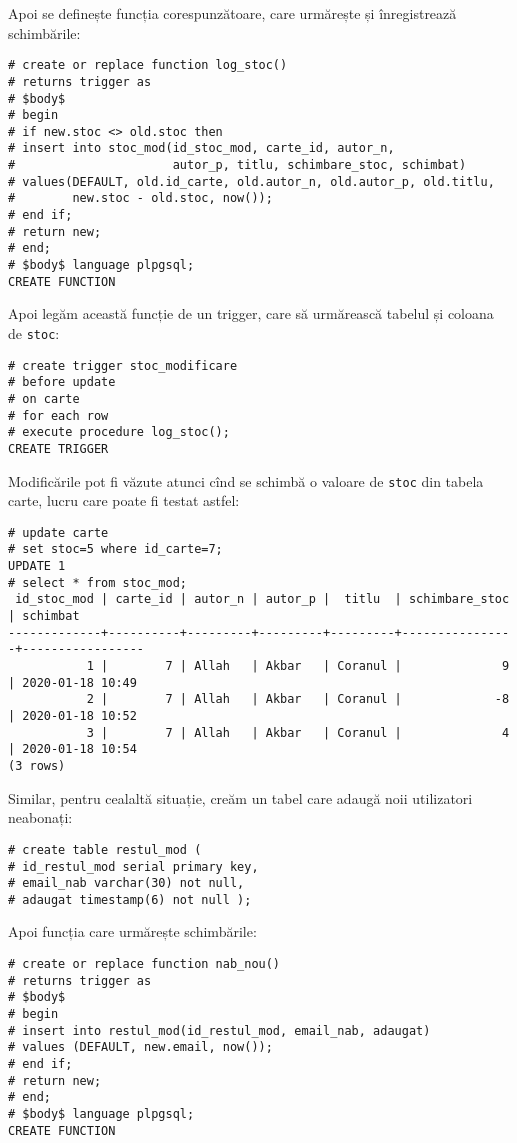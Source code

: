 Apoi se definește funcția corespunzătoare, care urmărește și înregistrează
schimbările:

{
  \small
\begin{verbatim}
# create or replace function log_stoc()
# returns trigger as
# $body$
# begin
# if new.stoc <> old.stoc then
# insert into stoc_mod(id_stoc_mod, carte_id, autor_n,
#                      autor_p, titlu, schimbare_stoc, schimbat)
# values(DEFAULT, old.id_carte, old.autor_n, old.autor_p, old.titlu, 
#        new.stoc - old.stoc, now());
# end if;
# return new;
# end;
# $body$ language plpgsql;
CREATE FUNCTION
\end{verbatim}
}

Apoi legăm această funcție de un trigger, care să urmărească tabelul
și coloana de \texttt{stoc}:
{
  \small
\begin{verbatim}
# create trigger stoc_modificare
# before update
# on carte
# for each row
# execute procedure log_stoc();
CREATE TRIGGER
\end{verbatim}
}

Modificările pot fi văzute atunci cînd se schimbă o valoare de \texttt{stoc}
din tabela carte, lucru care poate fi testat astfel:
{
  \small
\begin{verbatim}
# update carte
# set stoc=5 where id_carte=7;
UPDATE 1
# select * from stoc_mod;
 id_stoc_mod | carte_id | autor_n | autor_p |  titlu  | schimbare_stoc | schimbat          
-------------+----------+---------+---------+---------+----------------+-----------------
           1 |        7 | Allah   | Akbar   | Coranul |              9 | 2020-01-18 10:49
           2 |        7 | Allah   | Akbar   | Coranul |             -8 | 2020-01-18 10:52
           3 |        7 | Allah   | Akbar   | Coranul |              4 | 2020-01-18 10:54
(3 rows)
\end{verbatim}
}

Similar, pentru cealaltă situație, creăm un tabel care adaugă noii utilizatori
neabonați:
{
  \small
\begin{verbatim}
# create table restul_mod (
# id_restul_mod serial primary key,
# email_nab varchar(30) not null,
# adaugat timestamp(6) not null );
\end{verbatim}
}

Apoi funcția care urmărește schimbările:
{
  \small
\begin{verbatim}
# create or replace function nab_nou()
# returns trigger as
# $body$
# begin
# insert into restul_mod(id_restul_mod, email_nab, adaugat)
# values (DEFAULT, new.email, now());
# end if;
# return new;
# end;
# $body$ language plpgsql;
CREATE FUNCTION
\end{verbatim}
}

